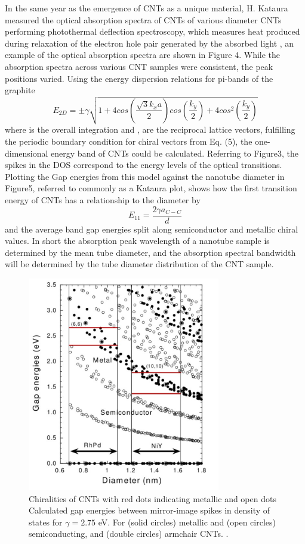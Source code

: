 In the same year as the emergence of CNTs as a unique material, H. Kataura measured the optical absorption spectra of CNTs of various diameter CNTs performing photothermal deflection spectroscopy, which measures heat produced during relaxation of the electron hole pair generated by the absorbed light \cite{kataura}, an example of the optical absorption spectra  are shown in Figure 4. While the absorption spectra across various CNT samples were consistent, the peak positions varied. Using the energy dispersion relations for pi-bands of the graphite \cite{kataura}
\begin{equation}
E_{2D} = \pm\gamma\sqrt{1+4cos(\frac{\sqrt{3}k_x a}{2})cos(\frac{k_y}{2}) + 4cos^2(\frac{k_y}{2}) }
\end{equation}
where  is the overall integration and ,  are the reciprocal lattice vectors, fulfilling the periodic boundary condition for chiral vectors from Eq. (5), the one-dimensional energy band of CNTs could be calculated. Referring to Figure3, the spikes in the DOS correspond to the energy levels of the optical transitions. Plotting the Gap energies from this model against the nanotube diameter in Figure5, referred to commonly as a Kataura plot, shows how the first transition energy of CNTs has a relationship to the diameter by
\begin{equation}
E_{11} = \frac{2\gamma a_{C-C}}{d}
\end{equation}
and the average band gap energies split along semiconductor and metallic chiral values. In short the absorption peak wavelength of a nanotube sample is determined by the mean tube diameter, and the absorption spectral bandwidth will be determined by the tube diameter distribution of the CNT sample.
\begin{figure}[h]
	\centering
	\includegraphics[width=0.75\textwidth]{./Figures/CNTs/kautura.png}
	\caption{Chiralities of CNTs with red dots indicating metallic and open dots  Calculated gap energies between mirror-image spikes in density of states for $\gamma = 2.75$ eV. For (solid circles) metallic  and (open circles) semiconducting, and (double circles) armchair CNTs. \cite{kataura}. }
	\label{fig:kataura}
\end{figure}
\clearpage

